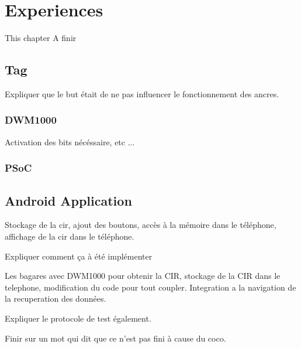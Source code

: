 \chapter{Experiences}

This chapter \color{red} A finir \color{black}

\section{Tag}

Expliquer que le but était de ne pas influencer le fonctionnement des ancres.

\subsection{DWM1000}

Activation des bits nécéssaire, etc ...

\subsection{PSoC}



\section{Android Application}

Stockage de la cir, ajout des boutons, accès à la mémoire dans le téléphone, affichage de la cir dans le téléphone.


Expliquer comment ça à été implémenter

Les bagares avec DWM1000 pour obtenir la CIR, stockage de la CIR dans le telephone, modification du code pour tout coupler. Integration a la navigation de la recuperation des données.

Expliquer le protocole de test également.

Finir sur un mot qui dit que ce n'est pas fini à cause du coco.